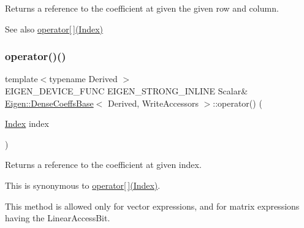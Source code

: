 \begin{DoxyReturn}{Returns}
a reference to the coefficient at given the given row and column.
\end{DoxyReturn}
\begin{DoxySeeAlso}{See also}
\mbox{\hyperlink{class_eigen_1_1_dense_coeffs_base_3_01_derived_00_01_write_accessors_01_4_a38f5d78476b3db56db98853af750cf31}{operator\mbox{[}$\,$\mbox{]}(\+Index)}} 
\end{DoxySeeAlso}
\mbox{\label{class_eigen_1_1_dense_coeffs_base_3_01_derived_00_01_write_accessors_01_4_a49d29adf378f99cd8ab048bff8a3f881}} 
\subsubsection{\texorpdfstring{operator()()}{operator()()}\hspace{0.1cm}{\footnotesize\ttfamily [2/2]}}
{\footnotesize\ttfamily template$<$typename Derived $>$ \\
E\+I\+G\+E\+N\+\_\+\+D\+E\+V\+I\+C\+E\+\_\+\+F\+U\+NC E\+I\+G\+E\+N\+\_\+\+S\+T\+R\+O\+N\+G\+\_\+\+I\+N\+L\+I\+NE Scalar\& \mbox{\hyperlink{class_eigen_1_1_dense_coeffs_base}{Eigen\+::\+Dense\+Coeffs\+Base}}$<$ Derived, Write\+Accessors $>$\+::operator() (\begin{DoxyParamCaption}\item[{\mbox{\hyperlink{struct_eigen_1_1_eigen_base_a554f30542cc2316add4b1ea0a492ff02}{Index}}}]{index }\end{DoxyParamCaption})\hspace{0.3cm}{\ttfamily [inline]}}

\begin{DoxyReturn}{Returns}
a reference to the coefficient at given index.
\end{DoxyReturn}
This is synonymous to \mbox{\hyperlink{class_eigen_1_1_dense_coeffs_base_3_01_derived_00_01_write_accessors_01_4_a38f5d78476b3db56db98853af750cf31}{operator\mbox{[}$\,$\mbox{]}(\+Index)}}.

This method is allowed only for vector expressions, and for matrix expressions having the Linear\+Access\+Bit.

